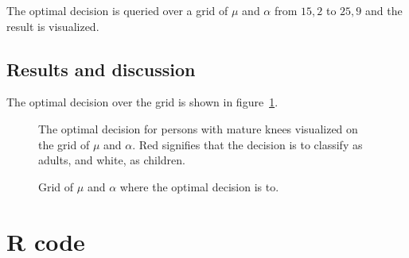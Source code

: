 \documentclass[11pt, a4paper]{article}
\begin{document}
The optimal decision is queried over a grid of $\mu$ and $\alpha$
from $15, 2$ to $25, 9$ and the result is visualized.
\subsection{Results and discussion}
The optimal decision over the grid is shown in figure~\ref{fig:optimal_c}.

\begin{figure}
	\centering
	
	\caption{The optimal decision for persons with mature knees visualized on
		the grid of $\mu$ and $\alpha$.
		Red signifies that the decision is to classify as adults, and white, as children.
	\label{fig:optimal_c}}
\end{figure}

\begin{figure}
	\centering
	
	\caption{Grid of $\mu$ and $\alpha$ where the optimal decision is to.}
\end{figure}

\clearpage
\appendix %

\section{R code}
% 
\end{document}
